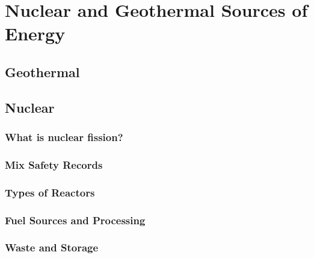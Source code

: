 \chapter{Nuclear and Geothermal Sources of Energy}\label{ch:non_GHG}




\section{Geothermal}



\section{Nuclear}

\subsection{What is nuclear fission?}

\subsection{Mix Safety Records}

\subsection{Types of Reactors}

\subsection{Fuel Sources and Processing}

\subsection{Waste and Storage}



